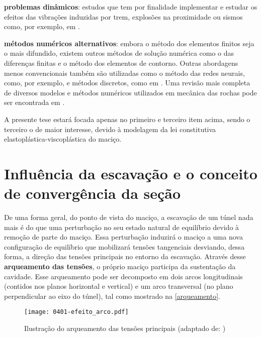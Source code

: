 \begin{alineas}
	\item \textbf{problemas dinâmicos}: estudos que tem por finalidade implementar e estudar os efeitos das vibrações induzidas por trem, explosões na proximidade ou sismos como, por exemplo, em .
	
	\item \textbf{métodos numéricos alternativos}: embora o método dos elementos finitos seja o mais difundido, existem outros métodos de solução numérica como o das diferenças finitas e o método dos elementos de contorno. Outras abordagens menos convencionais também são utilizadas como o método das redes neurais, como, por exemplo,  e métodos discretos, como em . Uma revisão mais completa de diversos modelos e métodos numéricos utilizados em mecânica das rochas pode ser encontrada em .
	
\end{alineas}

A presente tese estará focada apenas no primeiro e terceiro item acima, sendo o terceiro o de maior interesse, devido à modelagem da lei constitutiva elastoplástica-viscoplástica do maciço.

\section{Influência da escavação e o conceito de convergência da seção}
\label{cap:Influência da escavação e o conceito de convergência da seção}
De uma forma geral, do ponto de vista do maciço, a escavação de um túnel nada mais é do que uma perturbação no seu estado natural de equilíbrio devido à remoção de parte do maciço. Essa perturbação induzirá o maciço a uma nova configuração de equilíbrio que mobilizará tensões tangenciais desviando, dessa forma, a direção das tensões principais no entorno da escavação. Através desse \textbf{arqueamento das tensões}, o próprio maciço participa da sustentação da cavidade. Esse arqueamento pode ser decomposto em dois arcos longitudinais (contidos nos planos horizontal e vertical) e um arco transversal (no plano perpendicular ao eixo do túnel), tal como mostrado na \autoref{arqueamento}.

\begin{figure}[H]
	\begin{center}
		\texttt{[image: 0401-efeito\_arco.pdf]}
	\end{center}
	\caption{\label{arqueamento}Ilustração do arqueamento das tensões principais (adaptado de: )}
\end{figure}

